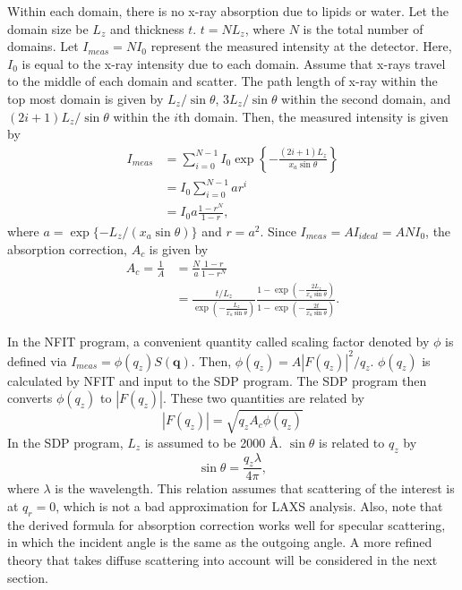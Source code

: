 \documentclass[letterpaper,12pt]{article}
\begin{document}
Within each domain, there is no x-ray
absorption due to lipids or water. Let the domain size be $L_z$ and thickness $t$.
$t=NL_z$, where $N$ is the total number of domains. Let $I_{meas}=NI_0$ represent
the measured intensity at the detector. Here, $I_0$ is equal to the x-ray intensity
due to each domain. Assume that x-rays travel to the middle of each domain and 
scatter. The path length of x-ray within the top most domain is given by 
$L_z/\sin\theta$, $3L_z/\sin\theta$ within the second domain, and 
$(2i+1)L_z/\sin\theta$ within the $i$th domain. Then, the measured intensity is
given by  
\begin{align}
  I_{meas} 
    &= \sum_{i=0}^{N-1} I_0 \exp
       \left\{-\frac{(2i+1)L_z}{x_a\sin\theta}\right\} \nonumber \\
    &= I_0 \sum_{i=0}^{N-1} ar^i \nonumber \\
    &= I_0 a \frac{1-r^N}{1-r},
\end{align}
where $a=\exp\{-L_z/(x_a\sin\theta)\}$ and $r=a^2$. 
Since $I_{meas}=AI_{ideal}=ANI_0$, the absorption correction, $A_c$ is given by
\begin{align}
  A_c = \frac{1}{A} &= \frac{N}{a} \frac{1-r}{1-r^N}\\
                    &= \frac{t/L_z}{\exp(-\frac{L_z}{x_a\sin\theta})} 
                       \frac{1-\exp(-\frac{2L_z}{x_a\sin\theta})} 
                            {1-\exp(-\frac{2t}{x_a\sin\theta})}.
\end{align}

In the NFIT program, a convenient quantity called scaling factor denoted by $\phi$ 
is defined via  $I_{meas}=\phi(q_z)S(\mathbf{q})$. Then, $\phi(q_z)=A|F(q_z)|^2/q_z$. 
$\phi(q_z)$ is calculated by NFIT and input to the SDP program. The SDP program then
converts $\phi(q_z)$ to $|F(q_z)|$. These two quantities are related by
\begin{equation}
  |F(q_z)|=\sqrt{q_zA_c\phi(q_z)}
\end{equation}
In the SDP program, $L_z$ is assumed to be 2000 \AA. $\sin\theta$ is related to $q_z$
by
\begin{equation}
  \sin\theta = \frac{q_z\lambda}{4\pi},
\end{equation}
where $\lambda$ is the wavelength. This relation assumes that scattering of the 
interest is at $q_r=0$, which is not a bad approximation for LAXS analysis. Also, note
that the derived formula for absorption correction works well for specular scattering,
in which the incident angle is the same as the outgoing angle. A more refined theory
that takes diffuse scattering into account will be considered in the next section. 
\end{document}
